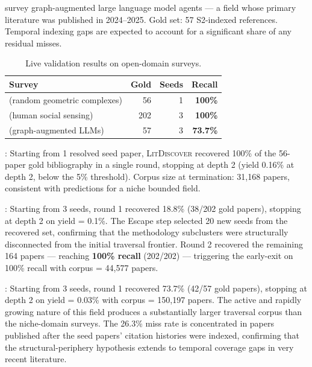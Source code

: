 \documentclass[manuscript,review,anonymous]{acmart}
\newcommand{\ldiscover}{\textsc{LitDiscover}}
\begin{document}
\citet{Liu2025} survey graph-augmented large language model agents --- a field whose primary
literature was published in 2024--2025. Gold set: 57 S2-indexed references. Temporal
indexing gaps are expected to account for a significant share of any residual misses.

\begin{table}[htbp]
\centering
\caption{Live validation results on open-domain surveys.}
\label{tab:live}
\begin{tabular}{@{}p{3.4cm}rrr@{}}
\toprule
Survey & Gold & Seeds & Recall \\
\midrule
\citet{Bobrowski2018} \newline (random geometric complexes) & 56 & 1 & \textbf{100\%} \\
\addlinespace
\citet{Galesic2021} \newline (human social sensing) & 202 & 3 & \textbf{100\%} \\
\addlinespace
\citet{Liu2025} \newline (graph-augmented LLMs) & 57 & 3 & \textbf{73.7\%} \\
\bottomrule
\end{tabular}
\end{table}

\textbf{\citet{Bobrowski2018}}: Starting from 1 resolved seed paper, \ldiscover{}
recovered 100\% of the 56-paper gold bibliography in a single round, stopping at depth 2
(yield 0.16\% at depth 2, below the 5\% threshold). Corpus size at termination: 31,168
papers, consistent with predictions for a niche bounded field.

\textbf{\citet{Galesic2021}}: Starting from 3 seeds, round 1 recovered 18.8\%
(38/202 gold papers), stopping at depth 2 on yield = 0.1\%. The Escape step selected 20
new seeds from the recovered set, confirming that the methodology subclusters were
structurally disconnected from the initial traversal frontier. Round 2 recovered the
remaining 164 papers --- reaching \textbf{100\% recall} (202/202) --- triggering the
early-exit on 100\% recall with corpus = 44,577 papers.

\textbf{\citet{Liu2025}}: Starting from 3 seeds, round 1 recovered 73.7\% (42/57 gold
papers), stopping at depth 2 on yield = 0.03\% with corpus = 150,197 papers. The active
and rapidly growing nature of this field produces a substantially larger traversal corpus
than the niche-domain surveys. The 26.3\% miss rate is concentrated in papers published
after the seed papers' citation histories were indexed, confirming that the
structural-periphery hypothesis extends to temporal coverage gaps in very recent
literature.
\end{document}

